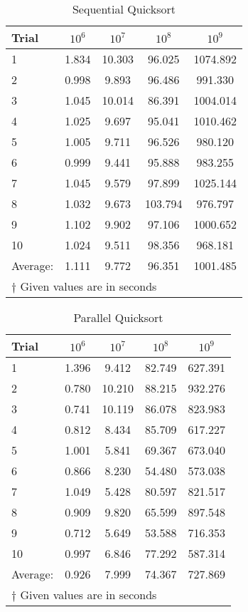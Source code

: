 \documentclass[addpoints]{exam}
\begin{document}
\begin{questions}
\begin{solution}
\begin{table}[H]
\centering
\caption{Sequential Quicksort}
\begin{tabular}{l | c c c c }
\hline\hline
Trial & $10^{6}$ & $10^{7}$ & $10^{8}$ & $10^{9}$\\
\hline
1 & 1.834 & 10.303 & \phantom{1}96.025 & 1074.892 \\
2 & 0.998 & \phantom{1}9.893 & \phantom{1}96.486 & \phantom{1}991.330 \\
3 & 1.045 & 10.014 & \phantom{1}86.391 & 1004.014\\
4 & 1.025 & \phantom{1}9.697 & \phantom{1}95.041 & 1010.462\\
5 & 1.005 & \phantom{1}9.711 & \phantom{1}96.526 & \phantom{1}980.120\\
6 & 0.999 & \phantom{1}9.441 & \phantom{1}95.888 & \phantom{1}983.255\\
7 & 1.045 & \phantom{1}9.579 & \phantom{1}97.899 & 1025.144\\
8 & 1.032 & \phantom{1}9.673 & 103.794 & \phantom{1}976.797\\
9 & 1.102 & \phantom{1}9.902 & \phantom{1}97.106 & 1000.652\\
10 & 1.024 & \phantom{1}9.511 & \phantom{1}98.356 & \phantom{1}968.181\\
\hline
Average: & 1.111 & \phantom{1}9.772 & \phantom{1}96.351 & 1001.485\\
\hline\hline
\multicolumn{5}{l}{{\scriptsize $\dagger$ Given values are in seconds}}
\end{tabular}
\label{table:qsort_seq}
\end{table}

\begin{table}[H]
\centering
\caption{Parallel Quicksort}
\begin{tabular}{l | c c c c }
\hline\hline
Trial & $10^{6}$ & $10^{7}$ & $10^{8}$ & $10^{9}$\\
\hline
1 & 1.396 & \phantom{1}9.412 & 82.749 & 627.391\\
2 & 0.780 & 10.210 & 88.215 & 932.276\\
3 & 0.741 & 10.119 & 86.078 & 823.983\\
4 & 0.812 & \phantom{1}8.434 & 85.709 & 617.227\\
5 & 1.001 & \phantom{1}5.841 & 69.367 & 673.040\\
6 & 0.866 & \phantom{1}8.230 & 54.480 & 573.038\\
7 & 1.049 & \phantom{1}5.428 & 80.597 & 821.517\\
8 & 0.909 & \phantom{1}9.820 & 65.599 & 897.548\\
9 & 0.712 & \phantom{1}5.649 & 53.588 & 716.353\\
10 & 0.997 & \phantom{1}6.846 & 77.292 & 587.314\\
\hline
Average: & 0.926 & \phantom{1}7.999 & 74.367 & 727.869\\
\hline\hline
\multicolumn{5}{l}{{\scriptsize $\dagger$ Given values are in seconds}}
\end{tabular}
\label{table:qsort_parallel}
\end{table}


\end{solution}
\end{questions}
\end{document}
